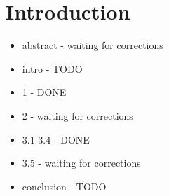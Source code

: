 \chapter*{Introduction}

\begin{itemize}
\huge \color{red}
\item abstract - waiting for corrections
\item intro - TODO
\item 1 - DONE
\item 2 - waiting for corrections
\item 3.1-3.4 - DONE
\item 3.5 - waiting for corrections
\item conclusion - TODO
\end{itemize}
